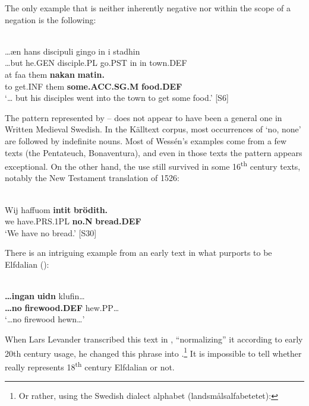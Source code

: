 \z

The only example that is neither inherently negative nor within the scope of a negation is the following:

\ea \label{} 
\\
\gll …æn  hans  discipuli  gingo  in  i  stadhin\\
…but  he.GEN  disciple.PL  go.PST  in  in  town.DEF\\
\gll at  faa  them  \textbf{nakan} \textbf{matin.}\\
to  get.INF  them  \textbf{some.ACC.SG.M} \textbf{food.DEF}\\
\glt ‘… but his disciples went into the town to get some food.’ [S6]

\z

The pattern represented by -- does not appear to have been a general one in Written Medieval Swedish. In the Källtext corpus, most occurrences of  ‘no, none’ are followed by indefinite nouns. Most of Wessén’s examples come from a few texts (the Pentateuch, Bonaventura), and even in those texts the pattern appears exceptional. On the other hand, the use still survived in some 16\textsuperscript{th} century texts, notably the New Testament translation of 1526:

\ea \label{} 
\\
\gll Wij  haffuom  \textbf{intit} \textbf{brödith.}\\
we  have.PRS.1PL  \textbf{no.N} \textbf{bread.DEF}\\
\glt ‘We have no bread.’ [S30]

\z

There is an intriguing example from an early text in what purports to be Elfdalian (\citet{Näsman1733}):

\ea \label{} 
\\
\gll \textbf{…ingan} \textbf{uidn} klufin…\\
\textbf{…no} \textbf{firewood.DEF} hew.PP…\\
\glt ‘…no firewood hewn…’

\z

When Lars Levander transcribed this text in \citet[T117]{Lundell1936}, “normalizing” it according to early 20th century usage, he changed this phrase into .\footnote{ Or rather, using the Swedish dialect alphabet (landsmålsalfabetetet):  }\textit{ }It is impossible to tell whether  really represents 18\textsuperscript{th} century Elfdalian or not. 

